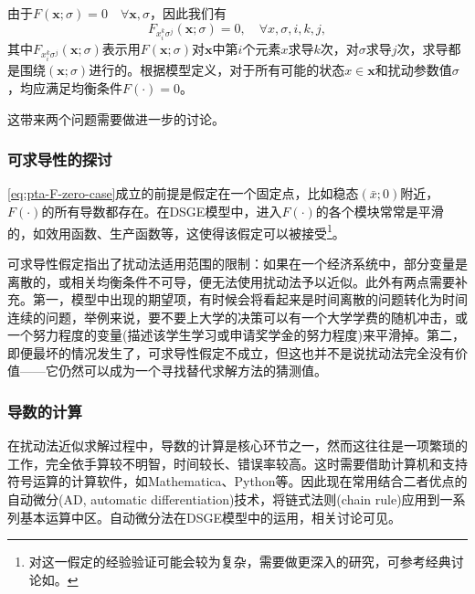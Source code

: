 由于$F(\bm{x};\sigma) = 0 \quad \forall \bm{x}, \sigma$，因此我们有
\begin{equation}
  \label{eq:pta-F-zero-case}
  F_{x_i^{k} \sigma^{j}} (\bm{x};\sigma) = 0, \quad \forall x, \sigma, i, k, j,
\end{equation}
其中$F_{x_i^{k} \sigma^{j}} (\bm{x};\sigma)$表示用$F(\bm{x};\sigma)$对$\bm{x}$中第$i$个元素$x$求导$k$次，对$\sigma$求导$j$次，求导都是围绕$(\bm{x};\sigma)$进行的。根据模型定义，对于所有可能的状态$x \in \bm{x}$和扰动参数值$\sigma$，均应满足均衡条件$F(\cdot)=0$。

这带来两个问题需要做进一步的讨论。
\subsubsection{可求导性的探讨}
\eqref{eq:pta-F-zero-case}成立的前提是假定在一个固定点，比如稳态$(\bar{x};0)$附近，$F(\cdot)$的所有导数都存在。在DSGE模型中，进入$F(\cdot)$的各个模块常常是平滑的，如效用函数、生产函数等，这使得该假定可以被接受\citep[pp463]{Judd:1998uy}\footnote{对这一假定的经验验证可能会较为复杂，需要做更深入的研究，可参考经典讨论如\cite{Santos:1992cp}。}。

可求导性假定指出了扰动法适用范围的限制：如果在一个经济系统中，部分变量是离散的，或相关均衡条件不可导，便无法使用扰动法予以近似。此外有两点需要补充。第一，模型中出现的期望项，有时候会将看起来是时间离散的问题转化为时间连续的问题，举例来说，要不要上大学的决策可以有一个大学学费的随机冲击，或一个努力程度的变量(描述该学生学习或申请奖学金的努力程度)来平滑掉。第二，即便最坏的情况发生了，可求导性假定不成立，但这也并不是说扰动法完全没有价值——它仍然可以成为一个寻找替代求解方法的猜测值。

\subsubsection{导数的计算}
在扰动法近似求解过程中，导数的计算是核心环节之一，然而这往往是一项繁琐的工作，完全依手算较不明智，时间较长、错误率较高\cite[ch.7]{Judd:1998uy}。这时需要借助计算机和支持符号运算的计算软件，如Mathematica、Python等。因此现在常用结合二者优点的自动微分(AD, automatic differentiation)技术，将链式法则(chain rule)应用到一系列基本运算中区。自动微分法在DSGE模型中的运用，相关讨论可见\cite{Bastani:2008ha}。

